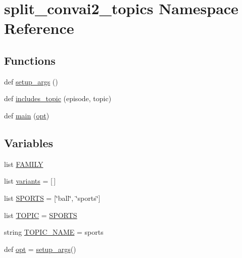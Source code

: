 \hypertarget{namespacesplit__convai2__topics}{}\section{split\+\_\+convai2\+\_\+topics Namespace Reference}
\label{namespacesplit__convai2__topics}
\subsection*{Functions}
\begin{DoxyCompactItemize}
\item 
def \hyperlink{namespacesplit__convai2__topics_a94fe060c5f31bc5a5a8b33c2a28f50f8}{setup\+\_\+args} ()
\item 
def \hyperlink{namespacesplit__convai2__topics_a141f246ea2a420cf68009cb02b0fe41d}{includes\+\_\+topic} (episode, topic)
\item 
def \hyperlink{namespacesplit__convai2__topics_a4477eb52fdcb7e5f0da1639ecd493130}{main} (\hyperlink{namespacesplit__convai2__topics_a60cd6faaa7a004794b9023bda5954a3c}{opt})
\end{DoxyCompactItemize}
\subsection*{Variables}
\begin{DoxyCompactItemize}
\item 
list \hyperlink{namespacesplit__convai2__topics_a6f7c4fd4944e5189515d3d8d0b3182ae}{F\+A\+M\+I\+LY}
\item 
list \hyperlink{namespacesplit__convai2__topics_a857e535782ce59a523b60a0489963f92}{variants} = \mbox{[}$\,$\mbox{]}
\item 
list \hyperlink{namespacesplit__convai2__topics_a2a4fdd83f40810da7299d0d546dc0218}{S\+P\+O\+R\+TS} = \mbox{[}\char`\"{}ball\char`\"{}, \char`\"{}sports\char`\"{}\mbox{]}
\item 
list \hyperlink{namespacesplit__convai2__topics_aa609f0883fcd414b29d582e18d043e27}{T\+O\+P\+IC} = \hyperlink{namespacesplit__convai2__topics_a2a4fdd83f40810da7299d0d546dc0218}{S\+P\+O\+R\+TS}
\item 
string \hyperlink{namespacesplit__convai2__topics_a64a4acce063d2a57cf6d882eb0862212}{T\+O\+P\+I\+C\+\_\+\+N\+A\+ME} = \textquotesingle{}sports\textquotesingle{}
\item 
def \hyperlink{namespacesplit__convai2__topics_a60cd6faaa7a004794b9023bda5954a3c}{opt} = \hyperlink{namespacesplit__convai2__topics_a94fe060c5f31bc5a5a8b33c2a28f50f8}{setup\+\_\+args}()
\end{DoxyCompactItemize}



